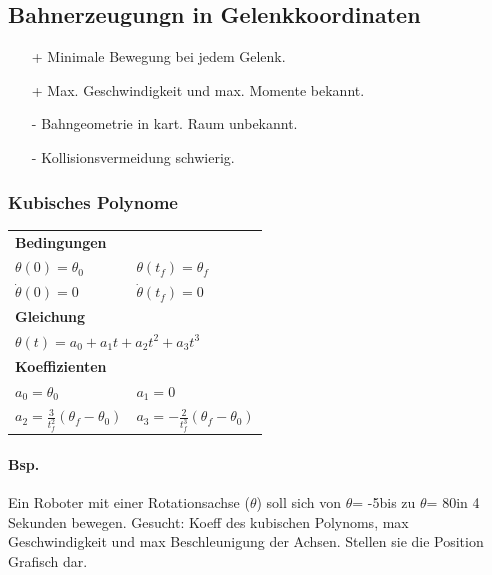 \subsection{Bahnerzeugungn in Gelenkkoordinaten}
\begin{multicols}{2}
    \begin{itemize}
        \item[+] Minimale Bewegung bei jedem Gelenk.
        \item[+] Max. Geschwindigkeit und max. Momente bekannt.
    \end{itemize}

    \begin{itemize}
        \item[-] Bahngeometrie in kart. Raum unbekannt.
        \item[-] Kollisionsvermeidung schwierig.
    \end{itemize}
\end{multicols}

\subsubsection{Kubisches Polynome}
\begin{tabular}{ll}
\multicolumn{2}{l}{\textbf{Bedingungen}}\\
$ \theta(0)=\theta_0 $& $ \theta(t_f) = \theta_f$\\ 
$ \dot{\theta}(0)=0 $& $ \dot{\theta}(t_f) = 0$\\
\multicolumn{2}{l}{\textbf{Gleichung}}\\
\multicolumn{2}{l}{$ \theta(t)=a_0 + a_1t + a_2t^2+a_3t^3$}\\
\multicolumn{2}{l}{\textbf{Koeffizienten}}\\
$a_0= \theta_0$&$a_1=0 $\\
$a_2 = \frac{3}{t_f^2}(\theta_f - \theta_0) $&$a_3=-\frac{2}{t_f^3}(\theta_f-\theta_0) $\\
\end{tabular}
\paragraph{Bsp.}
Ein Roboter mit einer Rotationsachse ($\theta$) soll sich von $\theta$= -5\textdegree bis zu $\theta$= 80\textdegree in 4 Sekunden bewegen.\newline
Gesucht: Koeff des kubischen Polynoms, max Geschwindigkeit und max Beschleunigung der Achsen.
Stellen sie die Position Grafisch dar.

